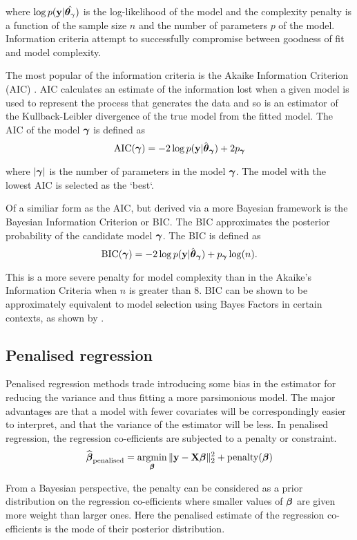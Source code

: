 \noindent where $\log p({\bf y} | \hat{{\boldsymbol \theta}_\gamma})$ is the log-likelihood of the model and the complexity
penalty is a function of the sample size $n$ and the number of parameters $p$ of the model. Information
criteria attempt to successfully compromise between goodness of fit and model complexity.

The most popular of the information criteria is the Akaike Information Criterion (AIC) \citep{Akaike1974}. AIC
calculates an estimate of the information lost when a given model is used to represent the process that
generates the data and so is an estimator of the Kullback-Leibler divergence of the true model from the fitted
model. The AIC of the model ${\boldsymbol \gamma}$ is defined as
\[
	\text{AIC}({\boldsymbol \gamma}) = -2 \log p({\bf y} | \hat{{\boldsymbol \theta}}_{\boldsymbol \gamma}) + 2 p_{\boldsymbol \gamma}
\]

\noindent where $|{\boldsymbol \gamma}|$ is the number of parameters in the model ${\boldsymbol \gamma}$. The model with the lowest AIC
is selected as the `best`.

Of a similiar form as the AIC, but derived via a more Bayesian framework is the Bayesian Information Criterion
or BIC. The BIC approximates the posterior probability of the candidate model ${\boldsymbol \gamma}$. The BIC is defined as
\[
	\text{BIC}({\boldsymbol \gamma}) = -2 \log p({\bf y} | \hat{{\boldsymbol \theta}}_{\boldsymbol \gamma}) + p_{\boldsymbol \gamma} \log(n).
\]

\noindent This is a more severe penalty for model complexity than in the Akaike's Information Criteria when
$n$ is greater than $8$. BIC can be shown to be approximately equivalent to model selection using Bayes
Factors in certain contexts, as shown by \cite{Kass1993}.

\subsection{Penalised regression}
Penalised regression methods trade introducing some bias in the estimator for reducing the variance and thus
fitting a more parsimonious model. The major advantages are that a model with fewer covariates will be
correspondingly easier to interpret, and that the variance of the estimator will be less. In penalised
regression, the regression co-efficients are subjected to a penalty or constraint.
$$
\widehat{\vbeta}_{\text{penalised}} = \argmin_\vbeta \|\vy - \mX \vbeta\|_2^2 + \text{penalty}(\vbeta)
$$

From a Bayesian perspective, the penalty can be considered as a prior distribution on the regression 
co-efficients where smaller values of ${\boldsymbol \beta}$ are given more weight than larger ones. Here the penalised
estimate of the regression co-efficients is the mode of their posterior distribution.

